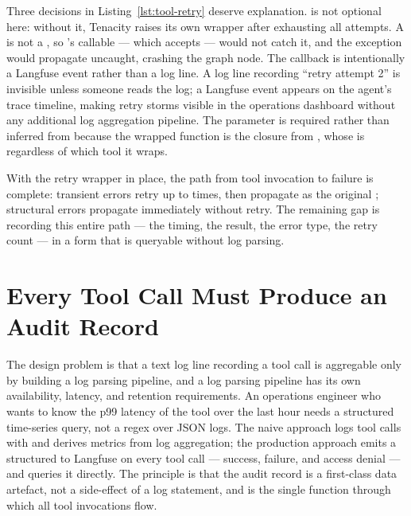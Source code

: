 Three decisions in Listing~\ref{lst:tool-retry} deserve explanation.
 is not optional here: without it, Tenacity raises its
own  wrapper after exhausting all attempts. A
 is not a , so 's
 callable --- which accepts 
--- would not catch it, and the exception would propagate uncaught,
crashing the graph node. The  callback is intentionally
a Langfuse event rather than a log line. A log line recording ``retry
attempt 2'' is invisible unless someone reads the log; a Langfuse event
appears on the agent's trace timeline, making retry storms visible in the
operations dashboard without any additional log aggregation pipeline. The
 parameter is required rather than inferred from
 because the wrapped function is the
 closure from , whose
 is  regardless of which tool it
wraps.

With the retry wrapper in place, the path from tool invocation to failure
is complete: transient errors retry up to  times, then
propagate as the original ; structural errors
propagate immediately without retry. The remaining gap is recording this
entire path --- the timing, the result, the error type, the retry count ---
in a form that is queryable without log parsing.


\section{Every Tool Call Must Produce an Audit Record}
\label{sec:tool-audit}

The design problem is that a text log line recording a tool call is
aggregable only by building a log parsing pipeline, and a log parsing
pipeline has its own availability, latency, and retention requirements.
An operations engineer who wants to know the p99 latency of the
 tool over the last hour needs a structured time-series
query, not a regex over JSON logs. The naive approach logs tool calls with
 and derives metrics from log aggregation; the
production approach emits a structured  to
Langfuse on every tool call --- success, failure, and access denial ---
and queries it directly. The principle is that the audit record is a
first-class data artefact, not a side-effect of a log statement, and
 is the single function through which all tool
invocations flow.

